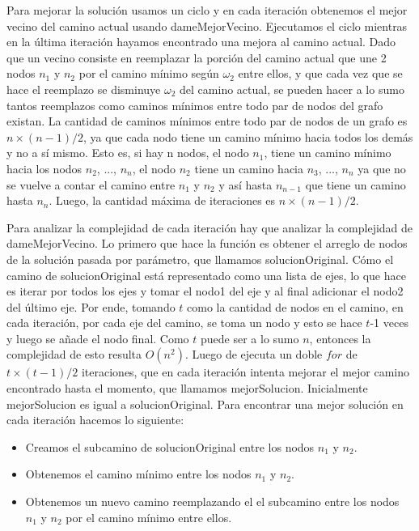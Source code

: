 Para mejorar la solución usamos un ciclo y en cada iteración obtenemos el mejor vecino del camino actual usando dameMejorVecino. Ejecutamos el ciclo mientras en la última iteración hayamos encontrado una mejora al camino actual. 
Dado que un vecino consiste en reemplazar la porción del camino actual que une 2 nodos $n_1$ y $n_2$ por el camino mínimo según $\omega_2$ entre ellos, y que cada vez que se hace el reemplazo se disminuye $\omega_2$ del camino actual, se pueden hacer a lo sumo tantos reemplazos como caminos mínimos entre todo par de nodos del grafo existan. 
La cantidad de caminos mínimos entre todo par de nodos de un grafo es $n \times (n-1) / 2$, ya que cada nodo tiene un camino mínimo hacia todos los demás y no a sí mismo. Esto es, si hay n nodos, el nodo $n_1$, tiene un camino mínimo hacia los nodos $n_2$, ..., $n_n$, el nodo $n_2$ tiene un camino hacia $n_3$, ..., $n_n$ ya que no se vuelve a contar el camino entre $n_1$ y $n_2$ y así hasta $n_{n-1}$ que tiene un camino hasta $n_n$.
Luego, la cantidad máxima de iteraciones es $n \times (n-1) / 2$.

Para analizar la complejidad de cada iteración hay que analizar la complejidad de dameMejorVecino. 
Lo primero que hace la función es obtener el arreglo de nodos de la solución pasada por parámetro, que llamamos solucionOriginal. Cómo el camino de solucionOriginal está representado como una lista de ejes, lo que hace es iterar por todos los ejes y tomar el nodo1 del eje y al final adicionar el nodo2 del último eje. Por ende, tomando $t$ como la cantidad de nodos en el camino, en cada iteración, por cada eje del camino, se toma un nodo y esto se hace $t$-1 veces y luego se añade el nodo final. Como $t$ puede ser a lo sumo $n$, entonces la complejidad de esto resulta $O(n^2)$.
Luego de ejecuta un doble $for$ de $t \times (t-1) / 2$ iteraciones, que en cada iteración intenta mejorar el mejor camino encontrado hasta el momento, que llamamos mejorSolucion. Inicialmente mejorSolucion es igual a solucionOriginal. 
Para encontrar una mejor solución en cada iteración hacemos lo siguiente:

\begin{itemize}
\item Creamos el subcamino de solucionOriginal entre los nodos $n_1$ y $n_2$.
\item Obtenemos el camino mínimo entre los nodos $n_1$ y $n_2$.
\item Obtenemos un nuevo camino reemplazando el el subcamino entre los nodos $n_1$ y $n_2$ por el camino mínimo entre ellos.
\end{itemize}

